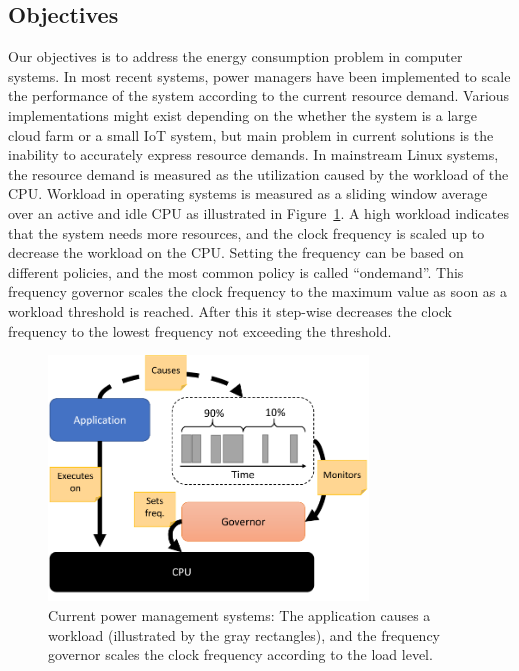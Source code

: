 \documentclass{article}
\begin{document}
\subsection{Objectives}
Our objectives is to address the energy consumption problem in computer systems.
In most recent systems, power managers have been implemented to scale the performance of the system according to the current resource demand.
Various implementations might exist depending on the whether the system is a large cloud farm or a small IoT system, 
but main problem in current solutions is the inability to accurately express resource demands.
In mainstream Linux systems, the resource demand is measured as the utilization caused by the workload of the CPU. 
Workload in operating systems is measured as a sliding window average over an active and idle CPU as illustrated in Figure~\ref{fig:workload}. 
A high workload indicates that the system needs more resources, and the clock frequency is scaled up to decrease the workload on the CPU.
Setting the frequency can be based on different policies, and the most common policy is called ``ondemand''\cite{ondemand}.
This frequency governor scales the clock frequency to the maximum value as soon as a workload threshold is reached.
After this it step-wise decreases the clock frequency to the lowest frequency not exceeding the threshold.\smallskip 
\begin{figure}
  \begin{center}
    \vspace{-0.8cm}
    \includegraphics[width=8.5cm]{fig/WorkloadMonitor.png}
  \end{center}
  \caption{Current power management systems: The application causes a workload (illustrated by the gray rectangles), and the frequency governor scales the clock frequency according to the load level.}
  \label{fig:workload}
\end{figure}
\end{document}

